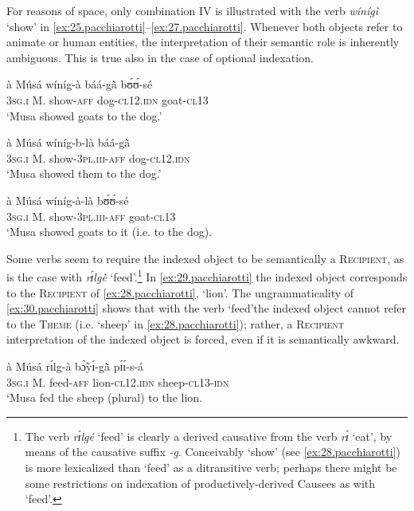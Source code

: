 \documentclass[output=paper]{langsci/langscibook}
\begin{document}
For reasons of space, only combination IV is illustrated with the verb \textit{w\'{i}n\'{i}g\`{i}} `show' in \ref{ex:25.pacchiarotti}--\ref{ex:27.pacchiarotti}. Whenever both objects refer to animate or human entities, the interpretation of their semantic role is inherently ambiguous. This is true also in the case of optional indexation.

\ea
\label{ex:25.pacchiarotti}
\gll \`{a}    M\'{u}s\'{a}  w\'{i}n\'{i}g-\`{a}  b\'{a}\'{a}-g\`{\~{a}}    bʊ́ʊ́-sé \\
\textsc{3sg.i  }  M.  show-\textsc{aff}  dog-\textsc{cl12.idn}  goat-\textsc{cl13}\\
\glt `Musa showed goats to the dog.'
\z

\ea
\label{ex:26.pacchiarotti}
\gll \`{a}    M\'{u}s\'{a}  w\'{i}n\'{i}g-b-l\`{a}    b\'{a}\'{a}-g\`{\~{a}}\\
\textsc{3sg.i} M.  show-\textsc{3pl.iii-aff}  dog-\textsc{cl12.idn}\\
\glt `Musa showed them to the dog.'  
\z

\ea
\label{ex:27.pacchiarotti}
\gll \`{a}    M\'{u}s\'{a}  w\'{i}n\'{i}g-\`{a}-l\`{a}    bʊ́ʊ́-sé\\
\textsc{3sg.i  }  M.  show-\textsc{3pl.iii-aff}  goat-\textsc{cl13}\\
\glt `Musa showed goats to it (i.e. to the dog).
\z

Some verbs seem to require the indexed object to be semantically a \textsc{Recipient}, as is the case with \textit{rɪ́lg\`{e}} `feed'.\footnote{ The verb \textit{rɪ́lgé} `feed' is clearly a derived causative from the verb \textit{rɪ́} `eat', by means of the causative suffix \textit{-g}. Conceivably `show' (see \ref{ex:28.pacchiarotti}) is more lexicalized than `feed' as a ditransitive verb; perhaps there might be some restrictions on indexation of productively-derived Causees as with `feed'.} In \ref{ex:29.pacchiarotti} the indexed object corresponds to the \textsc{Recipient} of \ref{ex:28.pacchiarotti}, `lion'. The ungrammaticality of \ref{ex:30.pacchiarotti} shows that with the verb `feed'the indexed object cannot refer to the \textsc{Theme} (i.e. `sheep' in \ref{ex:28.pacchiarotti}); rather, a \textsc{Recipient} interpretation of the indexed object is forced, even if it is semantically awkward.

\ea
\label{ex:28.pacchiarotti}
\gll \`{a}    M\'{u}s\'{a}  rɪ́lg-\`{a}    bɔ̃̀yɪ́-g\`{\~{a}}    pɪ́ɪ́-s-\'{a}\\
\textsc{3sg.i  }  M.  feed-\textsc{aff}  lion-\textsc{cl12.idn}  sheep-\textsc{cl13-idn}\\
\glt `Musa fed the sheep (plural) to the lion.
\z
\end{document}
